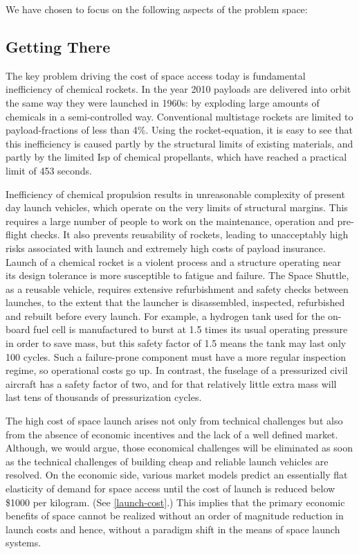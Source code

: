 \documentclass[letter,11pt]{article}
\begin{document}
We have chosen to focus on the following aspects of the problem space:

\subsection{Getting There}

The key problem driving the cost of space access today is fundamental
inefficiency of chemical rockets. In the year 2010 payloads are delivered into
orbit the same way they were launched in 1960s: by exploding large amounts of
chemicals in a semi-controlled way. Conventional multistage rockets are limited
to \glspl{payload-fraction} of less than 4\%. Using the \gls{rocket-equation},
it is easy to see that this inefficiency is caused partly by the structural
limits of existing materials, and partly by the limited \gls{Isp} of chemical
propellants, which have reached a practical limit of 453 seconds. 
 
Inefficiency of chemical propulsion results in unreasonable complexity of
present day launch vehicles, which operate on the very limits of structural
margins. This requires a large number of people to work on the maintenance,
operation and pre-flight checks.  It also prevents reusability of rockets,
leading to unacceptably high risks associated with launch and extremely high
costs of payload insurance. Launch of a chemical rocket is a violent process
and a structure operating near its design tolerance is more susceptible to
fatigue and failure. The Space Shuttle, as a reusable vehicle, requires
extensive refurbishment and safety checks between launches, to the extent that
the launcher is disassembled, inspected, refurbished and rebuilt before every
launch. For example, a hydrogen tank used for the on-board fuel cell is
manufactured to burst at 1.5 times its usual operating pressure in order to
save mass, but this safety factor of 1.5 means the tank may last only 100
cycles. Such a failure-prone component must have a more regular inspection
regime, so operational costs go up. In contrast, the fuselage of a pressurized
civil aircraft has a safety factor of two, and for that relatively little extra
mass will last tens of thousands of pressurization cycles. 
 
The high cost of space launch arises not only from technical challenges but
also from the absence of economic incentives and the lack of a well defined
market.  Although, we would argue, those economical challenges will be
eliminated as soon as the technical challenges of building cheap and reliable
launch vehicles are resolved. On the economic side, various market models
predict an essentially flat elasticity of demand for space access until the
cost of launch is reduced below \$1000 per kilogram\cite{CommSpace1997}. (See
\autoref{launch-cost}.) This implies that the primary economic benefits of space
cannot be realized without an order of magnitude reduction in launch costs and
hence, without a paradigm shift in the means of space launch systems. 
 
\end{document}
